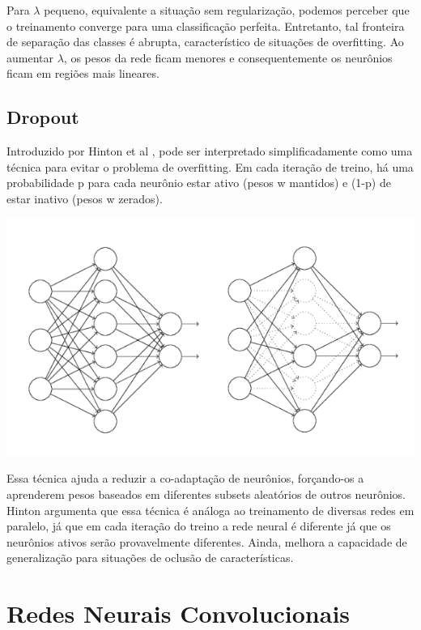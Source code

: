 \documentclass[
	12pt,				%
	oneside,			%
	a4paper,			%
	english,			%
	french,				%
	spanish,			%
	brazil,				%
	]{abntex2}
\begin{document}
 Para $\lambda$ pequeno, equivalente a situação sem regularização, podemos perceber que o treinamento converge para uma classificação perfeita. Entretanto, tal fronteira de separação das classes é abrupta, característico de situações de overfitting. Ao aumentar $\lambda$, os pesos da rede ficam menores e consequentemente os neurônios ficam em regiões mais lineares.

\section{Dropout}

Introduzido por Hinton et al \cite{dropout}, pode ser interpretado simplificadamente como uma técnica para evitar o problema de overfitting. Em cada iteração de treino, há uma probabilidade p para cada neurônio estar ativo (pesos w mantidos) e (1-p) de estar inativo (pesos w zerados). 

\begin{center}
	\includegraphics[scale=0.8]{dropout.png}
\end{center}

Essa técnica ajuda a reduzir a co-adaptação de neurônios, forçando-os a aprenderem pesos baseados em diferentes subsets aleatórios de outros neurônios. Hinton argumenta que essa técnica é análoga ao treinamento de diversas redes em paralelo, já que em cada iteração do treino a rede neural é diferente já que os neurônios ativos serão provavelmente diferentes. Ainda, melhora a capacidade de generalização para situações de oclusão de características.


\chapter{Redes Neurais Convolucionais}
\end{document}
